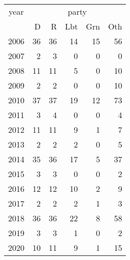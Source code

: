 \footnotesize\begin{tabular}[t]{lrrrrr}
\toprule
\multicolumn{1}{c}{year} & \multicolumn{5}{c}{party} \\
\cmidrule(l{3pt}r{3pt}){1-1} \cmidrule(l{3pt}r{3pt}){2-6}
  & D & R & Lbt & Grn & Oth\\
\midrule
2006 & 36 & 36 & 14 & 15 & 56\\
2007 & 2 & 3 & 0 & 0 & 0\\
2008 & 11 & 11 & 5 & 0 & 10\\
2009 & 2 & 2 & 0 & 0 & 10\\
2010 & 37 & 37 & 19 & 12 & 73\\
2011 & 3 & 4 & 0 & 0 & 4\\
2012 & 11 & 11 & 9 & 1 & 7\\
2013 & 2 & 2 & 2 & 0 & 5\\
2014 & 35 & 36 & 17 & 5 & 37\\
2015 & 3 & 3 & 0 & 0 & 2\\
2016 & 12 & 12 & 10 & 2 & 9\\
2017 & 2 & 2 & 2 & 1 & 3\\
2018 & 36 & 36 & 22 & 8 & 58\\
2019 & 3 & 3 & 1 & 0 & 2\\
2020 & 10 & 11 & 9 & 1 & 15\\
\bottomrule
\end{tabular}
